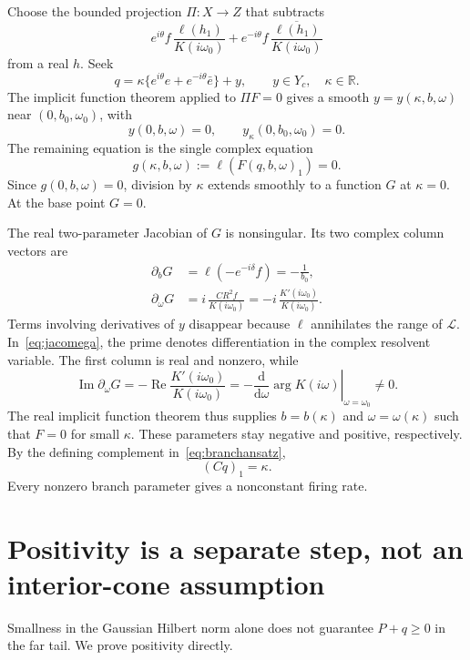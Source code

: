 \documentclass[11pt,a4paper]{article}
\numberwithin{equation}{section}
\theoremstyle{remark}\newtheorem{remark}[theorem]{Remark}
\newcommand{\R}{\mathbb R}\newcommand{\C}{\mathbb C}\newcommand{\T}{\mathbb T}
\DeclareMathOperator{\Rea}{Re}
\DeclareMathOperator{\Ima}{Im}
\begin{document}
Choose the bounded projection $\Pi:X\to Z$ that subtracts
\[
 e^{i\theta}f\,\frac{\ell(h_1)}{K(i\omega_0)}
 +e^{-i\theta}f\,\overline{\frac{\ell(h_1)}{K(i\omega_0)}}
\]
from a real $h$. Seek
\begin{equation}\label{eq:branchansatz}
 q=\kappa\{e^{i\theta}e+e^{-i\theta}\bar e\}+y,
 \qquad y\in Y_c,\quad\kappa\in\R.
\end{equation}
The implicit function theorem applied to $\Pi F=0$ gives a smooth
$y=y(\kappa,b,\omega)$ near $(0,b_0,\omega_0)$, with
\[
 y(0,b,\omega)=0,\qquad y_\kappa(0,b_0,\omega_0)=0.
\]
The remaining equation is the single complex equation
\[
 g(\kappa,b,\omega):=\ell(F(q,b,\omega)_1)=0.
\]
Since $g(0,b,\omega)=0$, division by $\kappa$ extends smoothly to a function $G$ at $\kappa=0$. At the base point $G=0$.

The real two-parameter Jacobian of $G$ is nonsingular. Its two complex column vectors are
\begin{align}
 \partial_bG&=\ell(-e^{-i\delta}f)=-\frac1{b_0},\label{eq:jacb}\\
 \partial_\omega G&=i\,\frac{CR^2f}{K(i\omega_0)}
          =-i\,\frac{K'(i\omega_0)}{K(i\omega_0)}.\label{eq:jacomega}
\end{align}
Terms involving derivatives of $y$ disappear because $\ell$ annihilates the range of $\mathcal L$. In~\eqref{eq:jacomega}, the prime denotes differentiation in the complex resolvent variable. The first column is real and nonzero, while
\[
 \Ima\partial_\omega G
 =-\Rea\frac{K'(i\omega_0)}{K(i\omega_0)}
 =-\left.\frac{\mathrm d}{\mathrm d\omega}\arg K(i\omega)
   \right|_{\omega=\omega_0}\ne0.
\]
The real implicit function theorem thus supplies $b=b(\kappa)$ and $\omega=\omega(\kappa)$ such that $F=0$ for small $\kappa$. These parameters stay negative and positive, respectively. By the defining complement in~\eqref{eq:branchansatz},
\begin{equation}\label{eq:nonconstant}
 (Cq)_1=\kappa.
\end{equation}
Every nonzero branch parameter gives a nonconstant firing rate.

\section{Positivity is a separate step, not an interior-cone assumption}
Smallness in the Gaussian Hilbert norm alone does not guarantee $P+q\geq0$ in the far tail. We prove positivity directly.
\end{document}
